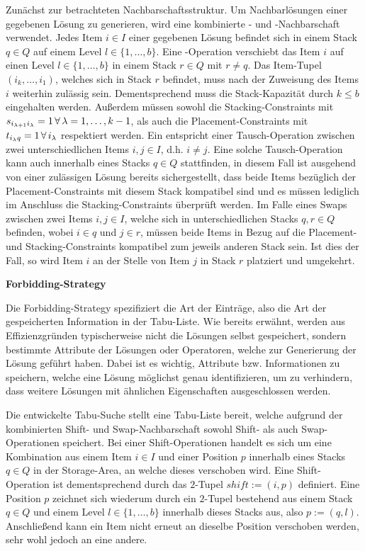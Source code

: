 Zunächst zur betrachteten Nachbarschaftsstruktur. Um Nachbarlösungen einer gegebenen Lösung zu generieren,
wird eine kombinierte - und -Nachbarschaft verwendet.
Jedes Item $i \in I$ einer gegebenen Lösung befindet sich in einem Stack $q \in Q$ auf einem Level $l \in \{1, \dotsc, b\}$.
Eine -Operation verschiebt das Item $i$ auf einen Level $l \in \{1, \dotsc, b\}$ in einem
Stack $r \in Q$ mit $r \neq q$. Das Item-Tupel $(i_k, \dotsc, i_1)$, welches sich in Stack $r$ befindet, muss nach der Zuweisung des Items $i$ weiterhin zulässig sein. Dementsprechend muss die Stack-Kapazität durch $k \leq b$ eingehalten werden.
Außerdem müssen sowohl die Stacking-Constraints mit $s_{i_{\lambda + 1}i_\lambda} = 1 \thinspace \forall \thinspace
\lambda = 1, \dotsc, k - 1$, als auch die Placement-Constraints mit $t_{i_\lambda q} = 1 \thinspace \forall
\thinspace i_\lambda$ respektiert werden.
Ein  entspricht einer Tausch-Operation zwischen zwei unterschiedlichen Items $i, j \in I$,
d.h. $i \neq j$. Eine solche Tausch-Operation kann auch innerhalb eines Stacks $q \in Q$ stattfinden,
in diesem Fall ist ausgehend von einer zulässigen Lösung bereits sichergestellt, dass beide Items bezüglich der Placement-Constraints mit diesem Stack kompatibel sind und es müssen lediglich im Anschluss die Stacking-Constraints überprüft werden. Im Falle eines Swaps zwischen zwei Items $i, j \in I$, welche sich in unterschiedlichen Stacks $q, r \in Q$ befinden, wobei $i \in q$ und $j \in r$, müssen beide Items in Bezug auf die Placement- und Stacking-Constraints kompatibel zum jeweils anderen Stack sein. Ist dies der Fall, so wird Item $i$ an der Stelle von Item $j$ in Stack $r$ platziert und umgekehrt.

\textbf{Forbidding-Strategy}

Die Forbidding-Strategy spezifiziert die Art der Einträge, also die Art der gespeicherten Information in der
Tabu-Liste. Wie bereits erwähnt, werden aus Effizienzgründen typischerweise nicht die Lösungen selbst gespeichert,
sondern bestimmte Attribute der Lösungen oder Operatoren, welche zur Generierung der Lösung geführt haben.
Dabei ist es wichtig, Attribute bzw. Informationen zu speichern, welche eine Lösung möglichst genau identifizieren,
um zu verhindern, dass weitere Lösungen mit ähnlichen Eigenschaften ausgeschlossen werden.

\vfill
\pagebreak

Die entwickelte Tabu-Suche stellt eine Tabu-Liste bereit, welche aufgrund der kombinierten Shift- und Swap-Nachbarschaft
sowohl Shift- als auch Swap-Operationen speichert. Bei einer Shift-Operationen handelt es sich um eine Kombination aus einem Item
$i \in I$ und einer Position $p$ innerhalb eines Stacks $q \in Q$ in der Storage-Area, an welche dieses verschoben wird. Eine Shift-Operation ist dementsprechend durch das $2$-Tupel $shift := (i, p)$ definiert.
Eine Position $p$ zeichnet sich wiederum durch ein $2$-Tupel bestehend aus einem Stack $q \in Q$ und einem Level $l \in \{1, \dotsc, b\}$ innerhalb dieses Stacks aus, also $p := (q, l)$.
Anschließend kann ein Item nicht erneut an dieselbe Position verschoben werden, sehr wohl jedoch an eine andere.


